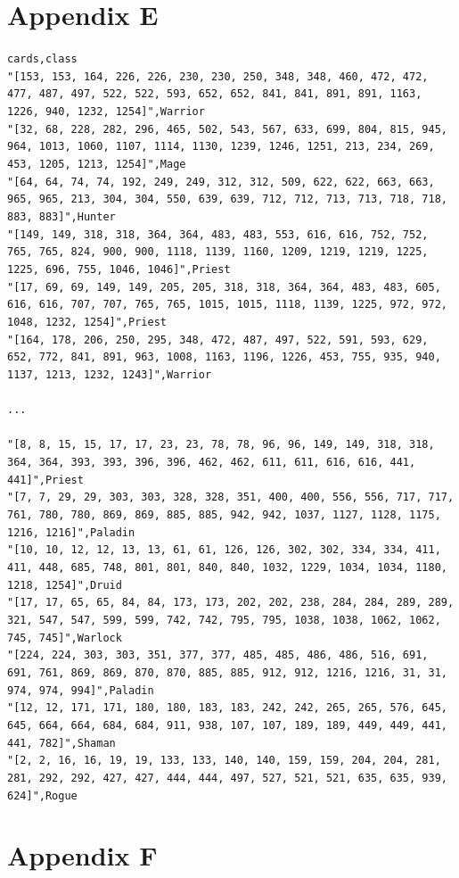 \documentclass{report} %
\begin{document}
\section*{Appendix E}
\texttt{cards,class\\
"[153, 153, 164, 226, 226, 230, 230, 250, 348, 348, 460, 472, 472, 477, 487, 497, 522, 522, 593, 652, 652, 841, 841, 891, 891, 1163, 1226, 940, 1232, 1254]",Warrior\\
"[32, 68, 228, 282, 296, 465, 502, 543, 567, 633, 699, 804, 815, 945, 964, 1013, 1060, 1107, 1114, 1130, 1239, 1246, 1251, 213, 234, 269, 453, 1205, 1213, 1254]",Mage\\
"[64, 64, 74, 74, 192, 249, 249, 312, 312, 509, 622, 622, 663, 663, 965, 965, 213, 304, 304, 550, 639, 639, 712, 712, 713, 713, 718, 718, 883, 883]",Hunter\\
"[149, 149, 318, 318, 364, 364, 483, 483, 553, 616, 616, 752, 752, 765, 765, 824, 900, 900, 1118, 1139, 1160, 1209, 1219, 1219, 1225, 1225, 696, 755, 1046, 1046]",Priest\\
"[17, 69, 69, 149, 149, 205, 205, 318, 318, 364, 364, 483, 483, 605, 616, 616, 707, 707, 765, 765, 1015, 1015, 1118, 1139, 1225, 972, 972, 1048, 1232, 1254]",Priest\\
"[164, 178, 206, 250, 295, 348, 472, 487, 497, 522, 591, 593, 629, 652, 772, 841, 891, 963, 1008, 1163, 1196, 1226, 453, 755, 935, 940, 1137, 1213, 1232, 1243]",Warrior\\ \\
...\\ \\
"[8, 8, 15, 15, 17, 17, 23, 23, 78, 78, 96, 96, 149, 149, 318, 318, 364, 364, 393, 393, 396, 396, 462, 462, 611, 611, 616, 616, 441, 441]",Priest\\
"[7, 7, 29, 29, 303, 303, 328, 328, 351, 400, 400, 556, 556, 717, 717, 761, 780, 780, 869, 869, 885, 885, 942, 942, 1037, 1127, 1128, 1175, 1216, 1216]",Paladin\\
"[10, 10, 12, 12, 13, 13, 61, 61, 126, 126, 302, 302, 334, 334, 411, 411, 448, 685, 748, 801, 801, 840, 840, 1032, 1229, 1034, 1034, 1180, 1218, 1254]",Druid\\
"[17, 17, 65, 65, 84, 84, 173, 173, 202, 202, 238, 284, 284, 289, 289, 321, 547, 547, 599, 599, 742, 742, 795, 795, 1038, 1038, 1062, 1062, 745, 745]",Warlock\\
"[224, 224, 303, 303, 351, 377, 377, 485, 485, 486, 486, 516, 691, 691, 761, 869, 869, 870, 870, 885, 885, 912, 912, 1216, 1216, 31, 31, 974, 974, 994]",Paladin\\
"[12, 12, 171, 171, 180, 180, 183, 183, 242, 242, 265, 265, 576, 645, 645, 664, 664, 684, 684, 911, 938, 107, 107, 189, 189, 449, 449, 441, 441, 782]",Shaman\\
"[2, 2, 16, 16, 19, 19, 133, 133, 140, 140, 159, 159, 204, 204, 281, 281, 292, 292, 427, 427, 444, 444, 497, 527, 521, 521, 635, 635, 939, 624]",Rogue\\
}

\section*{Appendix F}

\end{document}
